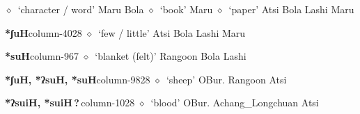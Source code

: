 \hspace{1ex}
         $\diamond$~`character / word'
         Maru 
\hspace{1ex}
         Bola 
\hspace{1ex}
         $\diamond$~`book'
         Maru 
\hspace{1ex}
         $\diamond$~`paper'
         Atsi 
\hspace{1ex}
         Bola 
\hspace{1ex}
         Lashi 
\hspace{1ex}
         Maru 
  \item {\footnotesize \textbf{*ʃuH}}{\tiny column-4028}
         $\diamond$~`few / little'
         Atsi 
\hspace{1ex}
         Bola 
\hspace{1ex}
         Lashi 
\hspace{1ex}
         Maru 
  \item {\footnotesize \textbf{*suH}}{\tiny column-967}
         $\diamond$~`blanket (felt)'
         Rangoon 
\hspace{1ex}
         Bola 
\hspace{1ex}
         Lashi 
  \item {\footnotesize \textbf{*ʃuH, *ʔsuH, *suH}}{\tiny column-9828}
         $\diamond$~`sheep'
         OBur. 
\hspace{1ex}
         Rangoon 
\hspace{1ex}
         Atsi 
  \item {\footnotesize \textbf{*ʔsuiH, *suiH\,?\,}}{\tiny column-1028}
         $\diamond$~`blood'
         OBur. 
\hspace{1ex}
         Achang\_Longchuan 
\hspace{1ex}
         Atsi 
\hspace{1ex}
